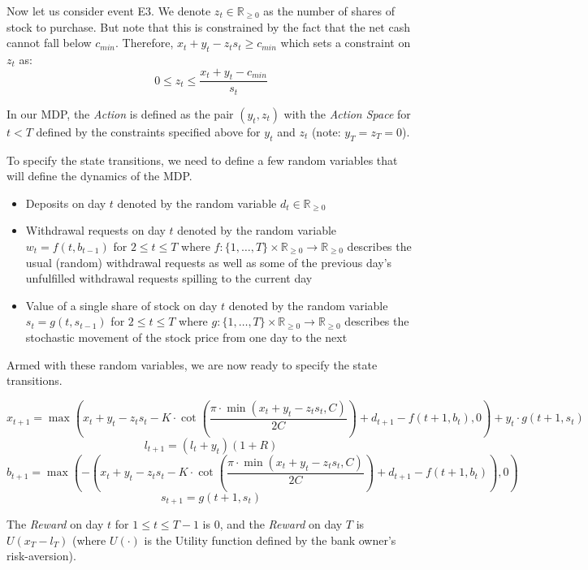 \documentclass[12pt]{exam}
\begin{document}
\begin{questions}
Now let us consider event E3. We denote $z_t\in \mathbb{R}_{\geq 0}$ as the number of shares of stock to purchase. But note that this is constrained by the fact that the net cash cannot fall below $c_{min}$. Therefore, $x_t + y_t - z_ts_t \geq c_{min}$ which sets a constraint on $z_t$ as:
$$0 \leq z_t \leq \frac {x_t + y_t - c_{min}} {s_t}$$
 
In our MDP, the {\em Action} is defined as the pair $(y_t,z_t)$ with the {\em Action Space} for $t < T$ defined by the constraints specified above for $y_t$ and $z_t$ (note: $y_T = z_T = 0$).

To specify the state transitions, we need to define a few random variables that will define the dynamics of the MDP.
\begin{itemize}
\item Deposits on day $t$ denoted by the random variable $d_t \in \mathbb{R}_{\geq 0}$
\item Withdrawal requests on day $t$ denoted by the random variable $w_t = f(t, b_{t-1})$ for $2 \leq t \leq T$ where $f: \{1, \ldots, T\} \times \mathbb{R}_{\geq 0} \rightarrow \mathbb{R}_{\geq 0}$ describes the usual (random) withdrawal requests as well as some of the previous day's unfulfilled withdrawal requests spilling to the current day
\item Value of a single share of stock on day $t$ denoted by the random variable $s_t = g(t, s_{t-1})$ for $2\leq t \leq T$ where $g: \{1, \ldots, T\} \times \mathbb{R}_{\geq 0} \rightarrow \mathbb{R}_{\geq 0}$ describes the stochastic movement of the stock price from one day to the next
\end{itemize}

Armed with these random variables, we are now ready to specify the state transitions.

$$x_{t+1} = \max(x_t + y_t - z_ts_t - K \cdot \cot(\frac {\pi \cdot \min(x_t + y_t - z_ts_t, C)} {2C})   + d_{t+1} - f(t+1, b_t), 0) + y_t \cdot g(t+1, s_t)$$
$$l_{t+1} = (l_t + y_t)(1+R)$$
$$b_{t+1} = \max(-(x_t + y_t - z_ts_t - K \cdot \cot(\frac {\pi \cdot \min(x_t + y_t - z_ts_t, C)} {2C})   + d_{t+1} - f(t+1,b_t)), 0)$$
$$s_{t+1} = g(t+1, s_t)$$


The {\em Reward} on day $t$ for $1\leq t \leq T-1$ is 0, and the {\em Reward} on day $T$ is $U(x_T - l_T)$ (where $U(\cdot)$ is the Utility function defined by the bank owner's risk-aversion). 



\end{questions}
\end{document}
